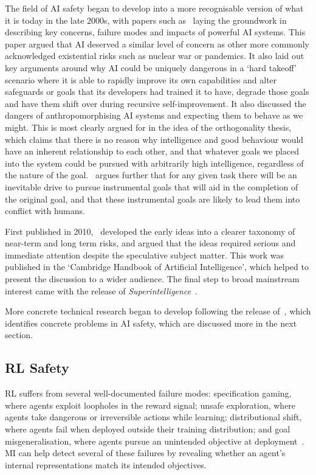 The field of AI safety began to develop into a more recognisable version of what it is today in the late 2000s, with papers such as~\citep{yudkowsky_2008_artificial} laying the groundwork in describing key concerns, failure modes and impacts of powerful AI systems. This paper argued that AI deserved a similar level of concern as other more commonly acknowledged existential risks such as nuclear war or pandemics. It also laid out key arguments around why AI could be uniquely dangerous in a `hard takeoff' scenario where it is able to rapidly improve its own capabilities and alter safeguards or goals that its developers had trained it to have, degrade those goals and have them shift over during recursive self-improvement. It also discussed the dangers of anthropomorphising AI systems and expecting them to behave as we might. This is most clearly argued for in the idea of the orthogonality thesis, which claims that there is no reason why intelligence and good behaviour would have an inherent relationship to each other, and that whatever goals we placed into the system could be pursued with arbitrarily high intelligence, regardless of the nature of the goal.~\citep{omohundro_2008_basic} argues further that for any given task there will be an inevitable drive to pursue instrumental goals that will aid in the completion of the original goal, and that these instrumental goals are likely to lead them into conflict with humans.

First published in 2010,~\citep{bostrom_2014_ethics} developed the early ideas into a clearer taxonomy of near-term and long term risks, and argued that the ideas required serious and immediate attention despite the speculative subject matter. This work was published in the `Cambridge Handbook of Artificial Intelligence', which helped to present the discussion to a wider audience. The final step to broad mainstream interest came with the release of \emph{Superintelligence}~\citep{bostrom_2014_superintelligence}.

More concrete technical research began to develop following the release of~\citet{Amodei_2016_AISafety}, which identifies concrete problems in AI safety, which are discussed more in the next section.

\subsection{RL Safety}
RL suffers from several well-documented failure modes: specification gaming, where agents exploit loopholes in the reward signal; unsafe exploration, where agents take dangerous or irreversible actions while learning; distributional shift, where agents fail when deployed outside their training distribution; and goal misgeneralisation, where agents pursue an unintended objective at deployment~\citep{Amodei_2016_AISafety,garcia2015safe,langosco2022goal,krakovna_2020_specification}. MI can help detect several of these failures by revealing whether an agent's internal representations match its intended objectives.

